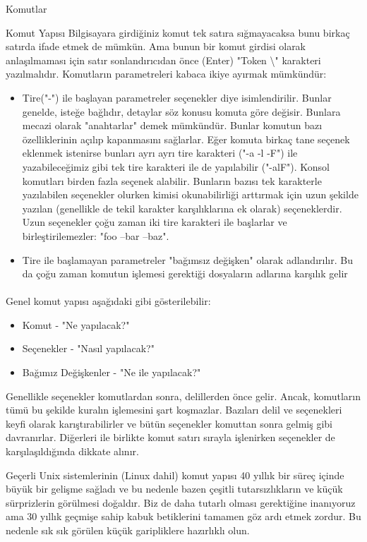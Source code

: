 \begin{section}{Komutlar}
\begin{subsection}{Komut Yapısı}
Bilgisayara girdiğiniz komut tek satıra sığmayacaksa bunu birkaç satırda ifade etmek de mümkün. Ama bunun bir komut girdisi olarak  anlaşılmaması için satır sonlandırıcıdan önce (Enter) "Token \textbackslash" karakteri yazılmalıdır. Komutların parametreleri kabaca ikiye ayırmak mümkündür:
\begin{itemize}
 \item Tire("-") ile başlayan parametreler seçenekler diye isimlendirilir. Bunlar genelde, isteğe bağlıdır, detaylar söz konusu komuta göre değisir. Bunlara mecazi olarak "anahtarlar" demek mümkündür. Bunlar komutun bazı özelliklerinin açılıp kapanmasını sağlarlar. Eğer komuta birkaç tane seçenek eklenmek istenirse bunları ayrı ayrı tire karakteri ("-a -l -F") ile yazabileceğimiz gibi tek tire karakteri ile de yapılabilir ("-alF"). Konsol komutları birden fazla seçenek alabilir. Bunların bazısı tek karakterle yazılabilen seçenekler olurken kimisi okunabilirliği arttırmak için uzun şekilde yazılan (genellikle de tekil karakter karşılıklarına ek olarak) seçeneklerdir. Uzun seçenekler çoğu zaman iki tire karakteri ile başlarlar ve birleştirilemezler: "foo --bar --baz".
 \item Tire ile başlamayan parametreler "bağımsız değişken" olarak adlandırılır. Bu da çoğu zaman komutun işlemesi gerektiği dosyaların adlarına karşılık gelir
\end{itemize}

\paragraph{}{Genel komut yapısı aşağıdaki gibi gösterilebilir:
\begin{itemize}
\item Komut - "Ne yapılacak?"
\item Seçenekler - "Nasıl yapılacak?"
\item Bağımız Değişkenler - "Ne ile yapılacak?"
\end{itemize}
}
\end{subsection}

Genellikle seçenekler komutlardan sonra, delillerden önce gelir. Ancak, komutların tümü bu şekilde kuralın işlemesini şart koşmazlar. Bazıları delil ve seçenekleri keyfi olarak karıştırabilirler ve bütün seçenekler komuttan sonra gelmiş gibi davranırlar. Diğerleri ile birlikte komut satırı sırayla işlenirken seçenekler de karşılaşıldığında dikkate alınır.

Geçerli Unix sistemlerinin (Linux dahil) komut yapısı 40 yıllık bir süreç içinde büyük bir gelişme sağladı ve bu nedenle bazen çeşitli tutarsızlıkların ve küçük sürprizlerin görülmesi doğaldır. Biz de daha tutarlı olması gerektiğine inanıyoruz ama 30 yıllık geçmişe sahip kabuk betiklerini tamamen göz ardı etmek zordur. Bu nedenle sık sık görülen küçük garipliklere hazırlıklı olun.


\end{section}
